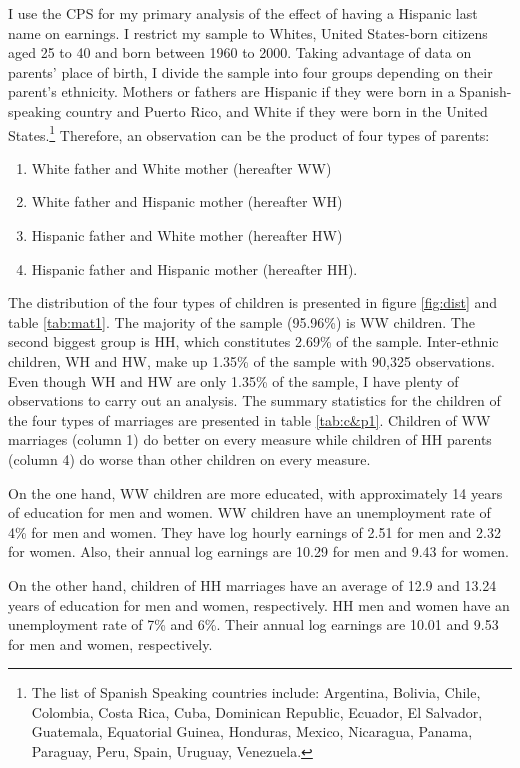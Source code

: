 \documentclass[12pt,english]{article}
\begin{document}
I use the CPS for my primary analysis of the effect of having a Hispanic last name on earnings. I restrict my sample to Whites, United States-born citizens aged 25 to 40 and born between 1960 to 2000. Taking advantage of data on parents' place of birth, I divide the sample into four groups depending on their parent's ethnicity. Mothers or fathers are Hispanic if they were born in a Spanish-speaking country and Puerto Rico, and White if they were born in the United States.\footnote{The list of Spanish Speaking countries include: Argentina, Bolivia, Chile, Colombia, Costa Rica, Cuba, Dominican Republic, Ecuador, El Salvador, Guatemala, Equatorial Guinea, Honduras, Mexico, Nicaragua, Panama, Paraguay, Peru, Spain, Uruguay, Venezuela.} Therefore, an observation can be the product of four types of parents: 
\begin{enumerate}
\item White father and White mother (hereafter WW) 
\item White father and Hispanic mother (hereafter WH)
\item Hispanic father and White mother (hereafter HW)
\item Hispanic father and Hispanic mother (hereafter HH).
\end{enumerate}

The distribution of the four types of children is presented in figure \ref{fig:dist} and table \ref{tab:mat1}. The majority of the sample (95.96\%) is WW children. The second biggest group is HH, which constitutes 2.69\% of the sample. Inter-ethnic children, WH and HW, make up 1.35\% of the sample with 90,325 observations. Even though WH and HW are only 1.35\% of the sample, I have plenty of observations to carry out an analysis. The summary statistics for the children of the four types of marriages are presented in table \ref{tab:c&p1}. Children of WW marriages (column 1) do better on every measure while children of HH parents (column 4) do worse than other children on every measure. 

On the one hand, WW children are more educated, with approximately 14 years of education for men and women. WW children have an unemployment rate of 4\% for men and women. They have log hourly earnings of 2.51 for men and 2.32 for women. Also, their annual log earnings are 10.29 for men and 9.43 for women.

On the other hand, children of HH marriages have an average of 12.9 and 13.24 years of education for men and women, respectively. HH men and women have an unemployment rate of 7\% and 6\%. Their annual log earnings are 10.01 and 9.53 for men and women, respectively. 
\end{document}

